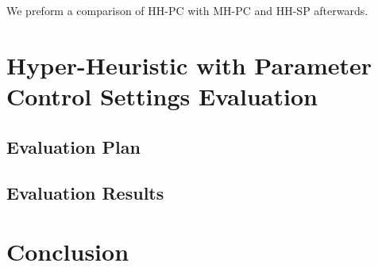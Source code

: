 We preform a comparison of HH-PC with MH-PC and HH-SP afterwards.


\section{Hyper-Heuristic with Parameter Control Settings Evaluation}\label{eval: hh-pc}
\subsection{Evaluation Plan}\label{eval: hh-pc plan}
\subsection{Evaluation Results}\label{eval: hh-pc results}



\section{Conclusion}\label{eval: conclution}
